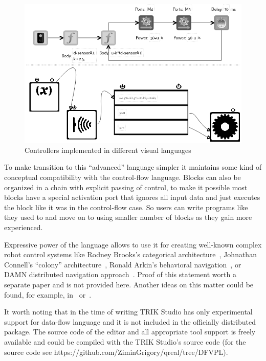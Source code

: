 \documentclass[conference]{IEEEtran}
\begin{document}
\begin{figure}[ht]
    \includegraphics[width=\columnwidth]{TS_AlongTheBox_Comparison.png}
    \caption{Controllers implemented in different visual languages}
    \label{image:alongTheBox_CF_DF}
\end{figure}

To make transition to this ``advanced'' language simpler it maintains some kind of conceptual compatibility with the control-flow language. Blocks can also be organized in a chain with explicit passing of control, to make it possible most blocks have a special activation port that ignores all input data and just executes the block like it was in the control-flow case. So users can write programs like they used to and move on to using smaller number of blocks as they gain more experienced.

Expressive power of the language allows to use it for creating well-known complex robot control systems like Rodney Brooks's categorical architecture~\cite{brooks1986robust}, Johnathan Connell's ``colony'' architecture~\cite{connell1989colony}, Ronald Arkin's behavioral navigation~\cite{arkin1987motor}, or DAMN distributed navigation approach~\cite{rosenblatt1997damn}. Proof of this statement worth a separate paper and is not provided here. Another ideas on this matter could be found, for example, in~\cite{simpson2009toward} or~\cite{banyasad2000visual}.

It worth noting that in the time of writing TRIK Studio has only experimental support for data-flow language and it is not included in the officially distributed package. The source code of the editor and all appropriate tool support is freely available and could be compiled with the TRIK Studio's source code (for the source code see https://github.com/ZiminGrigory/qreal/tree/DFVPL).
\end{document}

